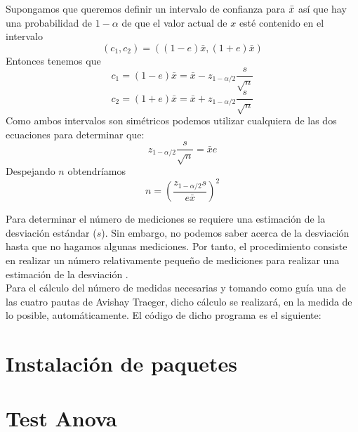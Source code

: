 Supongamos que queremos definir un intervalo de confianza para $\Bar{x}$ así que hay una probabilidad de $1-\alpha$ de que el valor actual de $x$ esté contenido en el intervalo  $$
\left(c_{1}, c_{2}\right)=((1-e) \bar{x},(1+e) \bar{x})
$$ 
Entonces tenemos que 
$$
c_{1}=(1-e) \bar{x}=\bar{x}-z_{1-\alpha / 2} \frac{s}{\sqrt{n}}
$$
$$
c_{2}=(1+e) \bar{x}=\bar{x}+z_{1-\alpha / 2} \frac{s}{\sqrt{n}}
$$
Como ambos intervalos son simétricos podemos utilizar cualquiera de las dos ecuaciones para determinar que:
$$
z_{1-\alpha / 2} \frac{s}{\sqrt{n}}=\bar{x} e
$$
Despejando $n$ obtendríamos
$$
n=\left(\frac{z_{1-\alpha / 2} s}{e \bar{x}}\right)^{2}
$$ 

Para determinar el número de mediciones se requiere una estimación de la desviación estándar ($s$). Sin embargo, no podemos saber acerca de la desviación hasta que no hagamos algunas mediciones. Por tanto, el procedimiento consiste en realizar un número relativamente pequeño de mediciones para realizar una estimación de la desviación \cite{lilja_2000}. \\ 

Para el cálculo del número de medidas necesarias y tomando como guía una de las cuatro pautas de Avishay Traeger, dicho cálculo se realizará, en la medida de lo posible, automáticamente. El código de dicho programa es el siguiente:  


\section{Instalación de paquetes}
\section{Test Anova}



